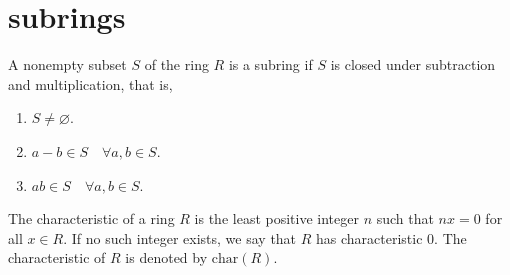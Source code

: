 \section{subrings}

\begin{theorem}
    A nonempty subset $S$ of the ring $R$ is a subring if $S$ is closed under subtraction and multiplication, that is,
    \begin{enumerate}
        \item $S \neq \varnothing$.
        \item $a - b \in S \quad \forall a, b \in S$.
        \item $ab \in S \quad \forall a, b \in S$.
    \end{enumerate}
\end{theorem}

\begin{definition}
    The characteristic of a ring $R$ is the least positive integer $n$ such that $nx = 0$ for all $x \in R$. If no such integer exists, we say that 
    $R$ has characteristic 0. The characteristic of $R$ is denoted by $\text{char}(R)$.
\end{definition}

